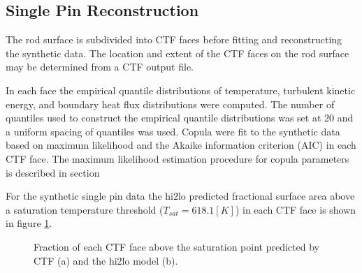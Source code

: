 \subsection{Single Pin Reconstruction}

The rod surface is subdivided into CTF faces before fitting and reconstructing the synthetic data.  The location and extent of the CTF faces on the rod surface may be determined from a CTF output file.  

In each face the empirical quantile distributions of temperature, turbulent kinetic energy, and boundary heat flux distributions were computed.  The number of quantiles used to construct the empirical quantile distributions was set at 20 and a uniform spacing of quantiles was used.  Copula were fit to the synthetic data based on maximum likelihood and the Akaike information criterion (AIC) in each CTF face.  The maximum likelihood estimation procedure for copula parameters is described in section %

For the synthetic single pin data the hi2lo predicted fractional surface area above a saturation temperature threshold ($T_{sat}=618.1[K]$) in each CTF face is shown in figure \ref{fig:frac_a}.

\begin{figure}[H]%
    \captionsetup[subfigure]{justification=centering}
    \centering
    \hspace*{-1.0em}%
    \caption{Fraction of each CTF face above the saturation point predicted by CTF (a) and the hi2lo model (b).}%
    \label{fig:frac_a}%
\end{figure}

